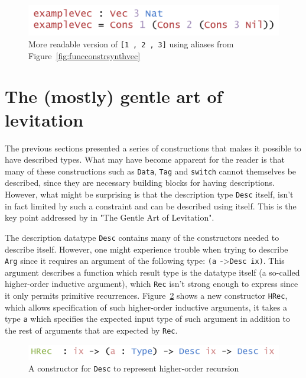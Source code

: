 \documentclass{ituthesis}
\newcommand{\ttconstructor}[1]{\textcolor{constructor-color}{\texttt{#1}}}
\newcommand{\tttype}[1]{\textcolor{type-color}{\texttt{#1}}}
\newcommand{\ttdec}[1]{\textcolor{declared-var-color}{\texttt{#1}}}
\newcommand{\ttvar}[1]{\textcolor{local-var-color}{\texttt{#1}}}
\newcommand{\ttliteral}[1]{\textcolor{literal-color}{\texttt{#1}}}
\theoremstyle{break}
\begin{document}
\begin{figure}[ht]
\begin{center}
    \includegraphics[scale=0.5]{Figures/VectorSynthesisedConstructorsExample.png}
\end{center}
\caption{More readable version of \ttconstructor{[}\ttliteral{1}~\ttconstructor{,}~\ttliteral{2}~\ttconstructor{,}~\ttliteral{3}\ttconstructor{]} using aliases from Figure~\ref{fig:funcconstrsynthvec}}
\label{fig:exmvecsynthvecdescconstrs}
\end{figure}

\section{The (mostly) gentle art of levitation}
\label{sec:TheMostlyGentleArtofLevitation}
The previous sections presented a series of constructions that makes it possible to have described types.
What may have become apparent for the reader is that many of these constructions such as \tttype{Data}, \tttype{Tag} and \ttdec{switch} cannot themselves be described,
since they are necessary building blocks for having descriptions.
However, what might be surprising is that the description type \tttype{Desc} itself, isn't in fact limited by such a constraint
and can be described using itself.
This is the key point addressed by \textcite{Chapman:2010:GAL:1863543.1863547} in "The Gentle Art of Levitation".

The description datatype \tttype{Desc} contains many of the constructors needed to describe itself.
However, one might experience trouble when trying to describe \ttconstructor{Arg} since it requires an argument of the following type:
\texttt{(}\ttvar{a}~->\tttype{Desc}~\ttvar{ix}\texttt{)}.
This argument describes a function which result type is the datatype itself (a so-called higher-order inductive argument), which \ttconstructor{Rec} isn't strong enough to express since it only permits primitive recurrences.
Figure~\ref{fig:deschrec} shows a new constructor \ttconstructor{HRec}, which allows specification of such higher-order inductive arguments, it takes a type \ttvar{a} which specifies
the expected input type of such argument in addition to the rest of arguments that are expected by \ttconstructor{Rec}.

\begin{figure}[ht]
\begin{center}
    \includegraphics[scale=0.5]{Figures/ADescriptionForDatatypesExtended.png}
\end{center}
\caption{A constructor for \tttype{Desc} to represent higher-order recursion}
\label{fig:deschrec}
\end{figure}
\end{document}
